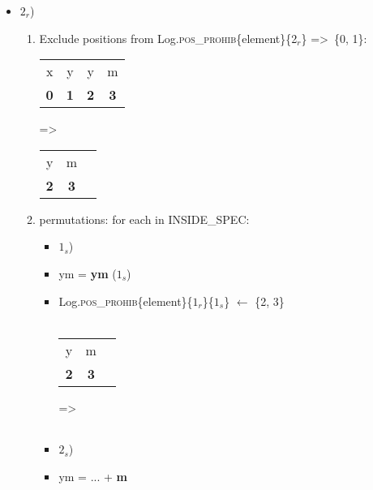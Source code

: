 \documentclass{article}
\let\emptyset\varnothing
\begin{document}
\begin{itemize}
\begin{itemize}
\begin{enumerate}
\begin{itemize}
            \end{itemize}
        \end{enumerate}
        \item $2_r$)
        \begin{enumerate}
            \item Exclude positions from Log.\textsc{pos\_prohib}\{element\}\{\textsc{2$_{r}$}\} =\textgreater ~\{0, 1\}:
            \\
            \begin{tabular}{ |c|c|c|c| } 
             \hline
             x & y & y & m \\ 
             \textbf{0} & \textbf{1} & \textbf{2} & \textbf{3} \\ 
             \hline
            \end{tabular}
            =\textgreater~
            \begin{tabular}{ |c|c|c| } 
             \hline
             y & m \\ 
             \textbf{2} & \textbf{3} \\ 
             \hline
            \end{tabular}
            \item permutations: for each in INSIDE\_SPEC:
            \begin{itemize}
                \item $1_s$)
                \item ym = \textbf{ym} ($1_s$)
                \item  Log.\textsc{pos\_prohib}\{element\}\{\textsc{$1_r$}\}\{\textsc{$1_s$}\} $\leftarrow$ \{2, 3\}
                \\ ~~~
                \begin{tabular}{ |c|c|c| } 
                 \hline
                 y & m \\ 
                 \textbf{2} & \textbf{3} \\ 
                 \hline
                \end{tabular}
                =\textgreater~
                \begin{tabular}{ |c|c|c| } 
                 \hline
                 \emptyset \\ 
                 \hline
                \end{tabular}
                \item $2_s$)
                \item ym = ... + \textbf{m}

\end{itemize}
\end{enumerate}
\end{itemize}
\end{itemize}
\end{document}
